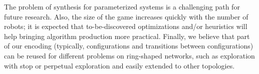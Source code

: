\documentclass[envcountsame]{llncs} \usepackage[english]{babel}
\begin{document}
The problem of synthesis for parameterized systems is a challenging path for future research. Also, the size of the game increases quickly with the number of robots; it is expected that to-be-discovered optimizations and/or heuristics will help bringing algorithm production more practical. Finally, we believe that part of our encoding (typically, configurations and transitions between configurations) can be reused for different problems on ring-shaped networks, such as exploration with stop or perpetual exploration and easily extended to other topologies.


 
 
\end{document}
